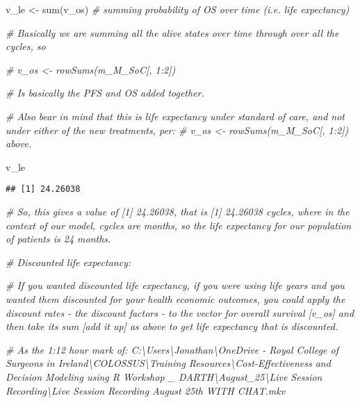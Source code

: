 \documentclass[
]{article}
\newenvironment{Shaded}{\begin{snugshade}}{\end{snugshade}}
\newcommand{\CommentTok}[1]{\textcolor[rgb]{0.56,0.35,0.01}{\textit{#1}}}
\newcommand{\FunctionTok}[1]{\textcolor[rgb]{0.00,0.00,0.00}{#1}}
\newcommand{\NormalTok}[1]{#1}
\newcommand{\OtherTok}[1]{\textcolor[rgb]{0.56,0.35,0.01}{#1}}
\begin{document}
\begin{Shaded}
\begin{Highlighting}[]
\NormalTok{v\_le }\OtherTok{\textless{}{-}} \FunctionTok{sum}\NormalTok{(v\_os)  }\CommentTok{\# summing probability of OS over time  (i.e. life expectancy)}

\CommentTok{\# Basically we are summing all the alive states over time through over all the cycles, so }

\CommentTok{\# v\_os \textless{}{-} rowSums(m\_M\_SoC[, 1:2])}

\CommentTok{\# Is basically the PFS and OS added together.}

\CommentTok{\# Also bear in mind that this is life expectancy under standard of care, and not under either of the new treatments, per: \# v\_os \textless{}{-} rowSums(m\_M\_SoC[, 1:2]) above.}

\NormalTok{v\_le}
\end{Highlighting}
\end{Shaded}

\begin{verbatim}
## [1] 24.26038
\end{verbatim}

\begin{Shaded}
\begin{Highlighting}[]
\CommentTok{\# So, this gives a value of [1] 24.26038, that is [1] 24.26038 cycles, where in the context of our model, cycles are months, so the life expectancy for our population of patients is 24 months.}


\CommentTok{\# Discounted life expectancy:}

\CommentTok{\# If you wanted discounted life expectancy, if you were using life years and you wanted them discounted for your health economic outcomes, you could apply the discount rates {-} the discount factors {-} to the vector for overall survival [v\_os] and then take it\textquotesingle{}s sum [add it up] as above to get life expectancy that is discounted.}

\CommentTok{\# As the 1:12 hour mark of: C:\textbackslash{}Users\textbackslash{}Jonathan\textbackslash{}OneDrive {-} Royal College of Surgeons in Ireland\textbackslash{}COLOSSUS\textbackslash{}Training Resources\textbackslash{}Cost{-}Effectiveness and Decision Modeling using R Workshop \_ DARTH\textbackslash{}August\_25\textbackslash{}Live Session Recording\textbackslash{}Live Session Recording August 25th WITH CHAT.mkv}
\end{Highlighting}
\end{Shaded}
\end{document}
